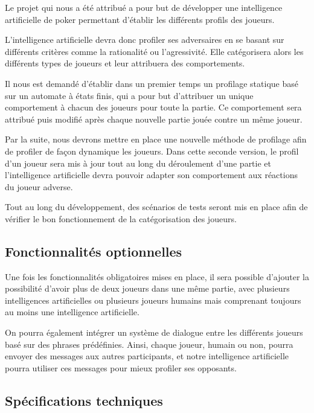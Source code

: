 \documentclass{report}
\begin{document}
\hspace{0.5cm}Le projet qui nous a été attribué a pour but de développer une intelligence artificielle de poker permettant d'établir les différents profils des joueurs.\par
L'intelligence artificielle devra donc profiler ses adversaires en se basant sur différents critères comme la rationalité ou l'agressivité. Elle catégorisera alors les différents types de joueurs et leur attribuera des comportements.\par
Il nous est demandé d'établir dans un premier temps un profilage statique basé sur un automate à états finis, qui a pour but d'attribuer un unique comportement à chacun des joueurs pour toute la partie. Ce comportement sera attribué puis modifié après chaque nouvelle partie jouée contre un même joueur.\par
Par la suite, nous devrons mettre en place une nouvelle méthode de profilage afin de profiler de façon dynamique les joueurs. Dans cette seconde version, le profil d'un joueur sera mis à jour tout au long du déroulement d'une partie et l'intelligence artificielle devra pouvoir adapter son comportement aux réactions du joueur adverse.\par
Tout au long du développement, des scénarios de tests seront mis en place afin de vérifier le bon fonctionnement de la catégorisation des joueurs.\par

\subsection{Fonctionnalités optionnelles}

\hspace{0.5cm}Une fois les fonctionnalités obligatoires mises en place, il sera possible d'ajouter la possibilité d'avoir plus de deux joueurs dans une même partie, avec plusieurs intelligences artificielles ou plusieurs joueurs humains mais comprenant toujours au moins une intelligence artificielle.\par
On pourra également intégrer un système de dialogue entre les différents joueurs basé sur des phrases prédéfinies. Ainsi, chaque joueur, humain ou non, pourra envoyer des messages aux autres participants, et notre intelligence artificielle pourra utiliser ces messages pour mieux profiler ses opposants.\par 

\subsection{Spécifications techniques}
\end{document}
